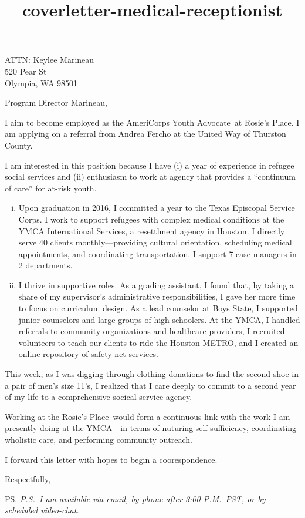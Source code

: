 \documentclass{letter}
\title{coverletter-medical-receptionist}
\newcommand{\jobtitle}{the AmeriCorps Youth Advocate}
\newcommand{\company}{Rosie's Place}
\begin{document}
\begin{letter}{ATTN: Keylee Marineau\\520 Pear St\\Olympia, WA 98501}
\opening{Program Director Marineau,}

I aim to become employed as \jobtitle\ at \company. I am applying on a referral from Andrea Fercho at the United Way of Thurston County. 

I am interested in this position because I have (i) a year of experience in refugee social services and (ii) enthusiasm to work at agency that provides a ``continuum of care'' for at-risk youth.

\begin{enumerate}[(i)]
	\item Upon graduation in 2016, I committed a year to the Texas Episcopal Service Corps. I work to support refugees with complex medical conditions at the YMCA International Services, a resettlment agency in Houston. I directly serve 40 clients monthly---providing cultural orientation, scheduling medical appointments, and coordinating transportation. I support 7 case managers in 2 departments.
	\item I thrive in supportive roles. As a grading assistant, I found that, by taking a share of my supervisor's administrative responsibilities, I gave her more time to focus on curriculum design. As a lead counselor at Boys State, I supported junior counselors and large groups of high schoolers. At the YMCA, I handled referrals to community organizations and healthcare providers, I recruited volunteers to teach our clients to ride the Houston METRO, and I created an online repository of safety-net services.
\end{enumerate}

This week, as I was digging through clothing donations to find the second shoe in a pair of men's size 11's, I realized that I care deeply to commit to a second year of my life to a comprehensive socical service agency. 

Working at the \company\ would form a continuous link with the work I am presently doing at the YMCA---in terms of nuturing self-sufficiency, coordinating wholistic care, and performing community outreach.


I forward this letter with hopes to begin a coorespondence.

\closing{Respectfully,}
\ps
\emph{P.S.\ I am available via email, by phone after 3:00 P.M.\ PST, or by scheduled video-chat.}

\end{letter}
\end{document}
